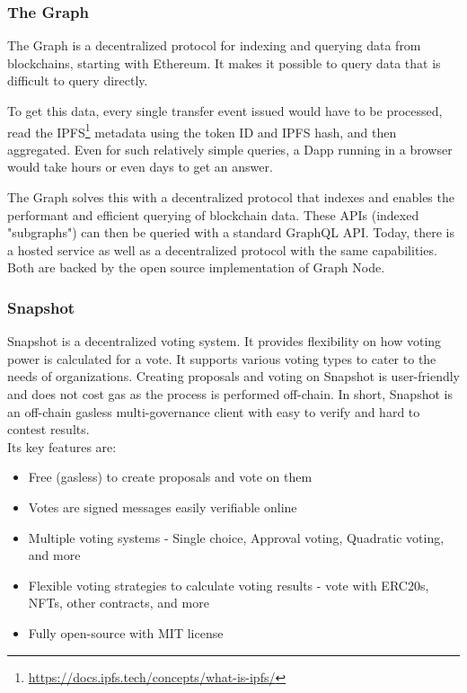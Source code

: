 \documentclass[MSE,Master,english]{twbook}%
\begin{document}
\subsubsection{The Graph}
The Graph\cite{thegraph} is a decentralized protocol for indexing and querying data from blockchains, starting with Ethereum. It makes it possible to query data that is difficult to query directly.

To get this data, every single transfer event issued would have to be processed, read the IPFS\footnote{\url{https://docs.ipfs.tech/concepts/what-is-ipfs/}} metadata using the token ID and IPFS hash, and then aggregated. Even for such relatively simple queries, a \ac{Dapp} running in a browser would take hours or even days to get an answer.

The Graph solves this with a decentralized protocol that indexes and enables the performant and efficient querying of blockchain data. These APIs (indexed "subgraphs") can then be queried with a standard GraphQL API. Today, there is a hosted service as well as a decentralized protocol with the same capabilities. Both are backed by the open source implementation of Graph Node.

\subsubsection{Snapshot}
Snapshot\cite{snapshot} is a decentralized voting system. It provides flexibility on how voting power is calculated for a vote. It supports various voting types to cater to the needs of organizations. Creating proposals and voting on Snapshot is user-friendly and does not cost gas as the process is performed off-chain.
In short, Snapshot is an off-chain gasless multi-governance client with easy to verify and hard to contest results.  \\

Its key features are:
\begin{itemize}
  \item Free (gasless) to create proposals and vote on them
  \item Votes are signed messages easily verifiable online
  \item Multiple voting systems - Single choice, Approval voting, Quadratic voting, and more
  \item Flexible voting strategies to calculate voting results - vote with ERC20s, NFTs, other contracts, and more
  \item Fully open-source with MIT license
\end{itemize}
\end{document}
